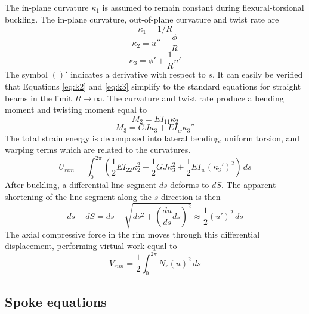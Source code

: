 \documentclass{bmd2016p}
\begin{document}
The in-plane curvature $\kappa_1$ is assumed to remain constant during flexural-torsional buckling. The in-plane curvature, out-of-plane curvature and twist rate are
\begin{equation}\label{eq:k1}
\kappa_1 = 1/R
\end{equation}
\begin{equation}\label{eq:k2}
\kappa_2 = u'' - \frac{\phi}{R}
\end{equation}
\begin{equation}\label{eq:k3}
\kappa_3 = \phi' + \frac{1}{R} u'
\end{equation}
The symbol $()'$ indicates a derivative with respect to $s$. It can easily be verified that Equations \ref{eq:k2} and \ref{eq:k3} simplify to the standard equations for straight beams in the limit $R\rightarrow \infty$. The curvature and twist rate produce a bending moment and twisting moment equal to
\begin{equation}\label{eq:M2}
M_2 = EI_{11} \kappa_2
\end{equation}
\begin{equation}\label{eq:M3}
M_3 = GJ \kappa_3 + EI_w \kappa_3''
\end{equation}
The total strain energy is decomposed into lateral bending, uniform torsion, and warping terms which are related to the curvatures.
\begin{equation}\label{eq:Urim}
U_{rim} = \int_0^{2\pi} \left( \frac{1}{2} EI_{22} \kappa_2^2 + \frac{1}{2} GJ \kappa_3^2 + \frac{1}{2} EI_w (\kappa_3')^2 \right)\, ds
\end{equation}
After buckling, a differential line segment $ds$ deforms to $dS$. The apparent shortening of the line segment along the $s$ direction is then
\begin{equation}\label{eq:ds}
ds - dS = ds - \sqrt{ds^2 + \left(\frac{du}{ds}ds\right)^2} \approx \frac{1}{2} (u')^2 \, ds
\end{equation}
The axial compressive force in the rim moves through this differential displacement, performing virtual work equal to
\begin{equation}\label{eq:Vrimr}
V_{rim} = \frac{1}{2} \int_0^{2\pi} N_r (u)^2 \, ds
\end{equation}


\subsection{Spoke equations}
\end{document}
